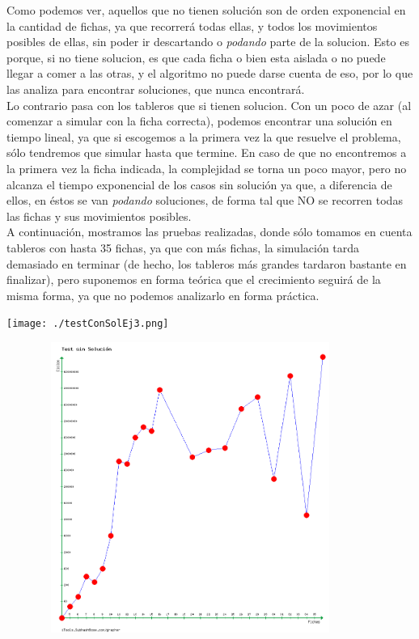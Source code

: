 Como podemos ver, aquellos que no tienen solución son de orden exponencial en la cantidad de fichas, ya que recorrerá todas ellas, y todos los movimientos posibles de ellas, sin poder ir descartando o \textit{podando} parte de la solucion. Esto es porque, si no tiene solucion, es que cada ficha o bien esta aislada o no puede llegar a comer a las otras, y el algoritmo no puede darse cuenta de eso, por lo que las analiza para encontrar soluciones, que nunca encontrará. \\
Lo contrario pasa con los tableros que si tienen solucion. Con un poco de azar (al comenzar a simular con la ficha correcta), podemos encontrar una solución en tiempo lineal, ya que si escogemos a la primera vez la que resuelve el problema, sólo tendremos que simular hasta que termine. En caso de que no encontremos a la primera vez la ficha indicada, la complejidad se torna un poco mayor, pero no alcanza el tiempo exponencial de los casos sin solución ya que, a diferencia de ellos, en éstos se van \textit{podando} soluciones, de forma tal que NO se recorren todas las fichas y sus movimientos posibles. \\
A continuación, mostramos las pruebas realizadas, donde sólo tomamos en cuenta tableros con hasta 35 fichas, ya que con más fichas, la simulación tarda demasiado en terminar (de hecho, los tableros más grandes tardaron bastante en finalizar), pero suponemos en forma teórica que el crecimiento seguirá de la misma forma, ya que no podemos analizarlo en forma práctica. \\

\begin {center}
\texttt{[image: ./testConSolEj3.png]}\\
\end {center}

\begin {center}
\includegraphics[width=12cm,height=9.5cm]{./testSinSolEj3.png}\\
\end {center}

